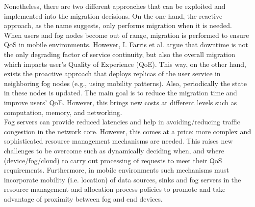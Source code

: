 Nonetheless, there are two different approaches that can be exploited and implemented into the migration decisions. On the one hand, the reactive approach, as the name suggests, only performs migration when it is needed. When users and fog nodes become out of range, migration is performed to ensure QoS in mobile environments. However, I. Farris et al. \cite{farris2017optimizing} argue that downtime is not the only degrading factor of service continuity, but also the overall migration which impacts user's Quality of Experience (QoE). This way, on the other hand, exists the proactive approach that deploys replicas of the user service in neighboring fog nodes (e.g., using mobility patterns). Also, periodically the state in these nodes is updated. The main goal is to reduce the migration time and improve users' QoE. However, this brings new costs at different levels such as computation, memory, and networking.\\[6pt]
Fog servers can provide reduced latencies and help in avoiding/reducing traffic congestion in the network core. However, this comes at a price: more complex and sophisticated resource management mechanisms are needed. This raises new challenges to be overcome such as dynamically deciding when, and where (device/fog/cloud) to carry out processing of requests to meet their QoS requirements. Furthermore, in mobile environments such mechanisms must incorporate mobility (i.e. location) of data sources, sinks and fog servers in the resource management and allocation process policies to promote and take advantage of proximity between fog and end devices.
